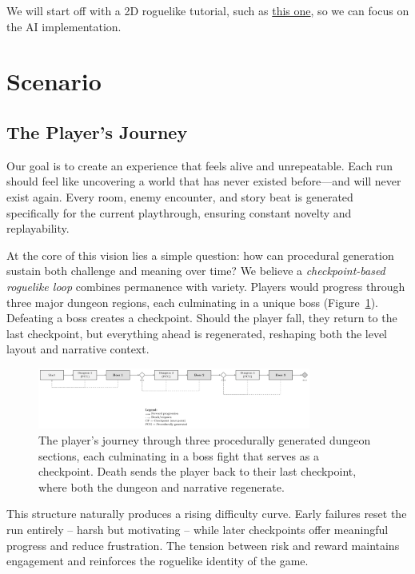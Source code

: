\documentclass[11pt]{article}
\begin{document}
We will start off with a 2D roguelike tutorial, such as \href{https://www.udemy.com/course/unityroguelike/?couponCode=MT251006G5}{this one}, so we can focus on the AI implementation.


\section{Scenario}
\label{sec:scenario}

\subsection{The Player's Journey}

Our goal is to create an experience that feels alive and unrepeatable. Each run should feel like uncovering a world that has never existed before—and will never exist again. Every room, enemy encounter, and story beat is generated specifically for the current playthrough, ensuring constant novelty and replayability. 

At the core of this vision lies a simple question: how can procedural generation sustain both challenge and meaning over time? We believe a \emph{checkpoint-based roguelike loop} combines permanence with variety. Players would progress through three major dungeon regions, each culminating in a unique boss (Figure~\ref{fig:game_flow}). Defeating a boss creates a checkpoint. 
Should the player fall, they return to the last checkpoint, but everything ahead is regenerated, reshaping both the level layout and narrative context. 

\begin{figure}[H]
    \centering
    \includegraphics[width=0.8\textwidth]{figures/game_flow.png}
    \caption{The player's journey through three procedurally generated dungeon sections, each culminating in a boss fight that serves as a checkpoint. Death sends the player back to their last checkpoint, where both the dungeon and narrative regenerate.}
    \label{fig:game_flow}
\end{figure}

This structure naturally produces a rising difficulty curve. 
Early failures reset the run entirely -- harsh but motivating -- while later checkpoints offer meaningful progress and reduce frustration. 
The tension between risk and reward maintains engagement and reinforces the roguelike identity of the game.
\end{document}
